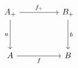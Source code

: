 \[\begin{tikzcd}
	{A_{+}} && {B_{+}} \\
	\\
	A && B
	\arrow["f"', from=3-1, to=3-3]
	\arrow["{f_{+}}", from=1-1, to=1-3]
	\arrow["a"', from=1-1, to=3-1]
	\arrow["b", from=1-3, to=3-3]
\end{tikzcd}\]